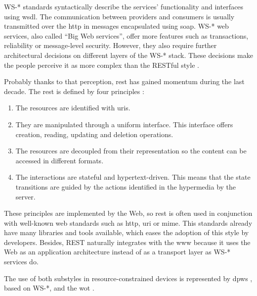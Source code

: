 WS-* standards syntactically describe the services' functionality and interfaces using \ac{wsdl}.
The communication between providers and consumers is usually transmitted over the \ac{http} in messages encapsulated using \ac{soap}.
WS-* web services, also called ``Big Web services'', offer more features such as transactions, reliability or message-level security.
However, they also require further architectural decisions on different layers of the WS-* stack.
These decisions make the people perceive it as more complex than the RESTful style \cite{guinard_search_2011}.


Probably thanks to that perception, \ac{rest} has gained momentum during the last decade. %
The \acl{rest} is defined by four principles \cite{fielding_architectural_2000}:
\begin{enumerate}
  \item The resources are identified with \acp{uri}.
  \item They are manipulated through a uniform interface.
	  This interface offers creation, reading, updating and deletion operations.
  \item The resources are decoupled from their representation so the content can be accessed in different formats.
  \item The interactions are stateful and hypertext-driven.
	This means that the state transitions are guided by the actions identified in the hypermedia by the server.
\end{enumerate}

These principles are implemented by the Web,
so \ac{rest}  is often used in conjunction with well-known web standards such as \ac{http}, \ac{uri} or \ac{mime}.
This standards already have many libraries and tools available, which eases the adoption of this style by developers.
Besides, REST naturally integrates with the \ac{www} because it uses the Web as an application architecture instead of as a transport layer as WS-* services do.

\bigskip


The use of both substyles in resource-constrained devices is represented by
\ac{dpws} \cite{moritz_devices_2010}, based on WS-*,
and the \ac{wot} \cite{guinard_internet_2011}. %


